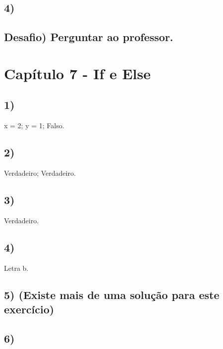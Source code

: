 

    
    \subsection*{4)}
    
 

    
    \subsection*{Desafio) Perguntar ao professor.}

\section*{Capítulo 7 - If e Else}

    \subsection*{1)} x = 2; y = 1; Falso.

    \subsection*{2)} Verdadeiro; Verdadeiro.

    \subsection*{3)} Verdadeiro.

    \subsection*{4)} Letra b.
    
    \subsection*{5) (Existe mais de uma solução para este exercício)}
    
 
    
    \subsection*{6)}
    
 


